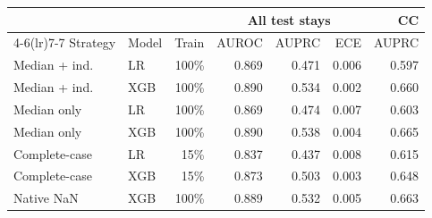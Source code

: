 \begin{tabular}{@{}llrrrrr@{}}
\toprule
 & & & \multicolumn{3}{c}{All test stays} & CC \\
\cmidrule(lr){4-6}\cmidrule(lr){7-7}
Strategy & Model & Train & AUROC & AUPRC & ECE & AUPRC \\
\midrule
Median + ind. & LR & 100\% & 0.869 & 0.471 & 0.006 & 0.597 \\
Median + ind. & XGB & 100\% & 0.890 & 0.534 & 0.002 & 0.660 \\
Median only & LR & 100\% & 0.869 & 0.474 & 0.007 & 0.603 \\
Median only & XGB & 100\% & 0.890 & 0.538 & 0.004 & 0.665 \\
Complete-case & LR & 15\% & 0.837 & 0.437 & 0.008 & 0.615 \\
Complete-case & XGB & 15\% & 0.873 & 0.503 & 0.003 & 0.648 \\
Native NaN & XGB & 100\% & 0.889 & 0.532 & 0.005 & 0.663 \\
\bottomrule
\end{tabular}
